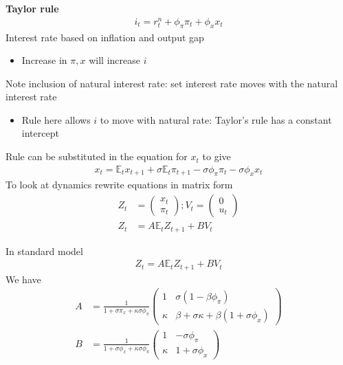 \documentclass{beamer}
\begin{document}
\begin{frame}
  \textbf{Taylor rule}  
\begin{align} 
  i_t=r_t^n+ \phi_{\pi}\pi_t+\phi_xx_t 
\end{align}
 \medskip
  Interest rate based on inflation and output gap
  \begin{itemize}
    \item Increase in $\pi,x$ will increase $i$    
  \end{itemize}
  \medskip
 Note inclusion of natural interest rate: set interest rate moves with the natural interest rate
 \begin{itemize}
   \item Rule here allows $i$ to move with natural rate: Taylor's rule has a constant intercept
 \end{itemize}
\end{frame}

\begin{frame}
  Rule can be substituted in the equation for $x_t$ to give
\begin{align}  
  x_t=\mathbb{E}_tx_{t+1} + \sigma \mathbb{E}_t \pi_{t+1} - \sigma\phi_{\pi}\pi_t -\sigma\phi_x x_t 
\end{align}  
 To look at dynamics rewrite equations in matrix form
 \begin{align}
  Z_t&=\begin{pmatrix} x_t \\ \pi_t \end{pmatrix}; V_t=\begin{pmatrix}  0 \\u_t \end{pmatrix} \\
  Z_t&=A\mathbb{E}_tZ_{t+1}+BV_t 
 \end{align}
\end{frame}


\begin{frame}
 In standard model
 \begin{align*}
   Z_t=A\mathbb{E}_tZ_{t+1}+BV_t 
 \end{align*}
  We have
  \begin{align}
  A &= \frac{1}{1+\sigma\pi_x + \kappa\sigma\phi_{\pi}} \begin{pmatrix}
    1 & \sigma(1-\beta\phi_{\pi}) \\
    \kappa & \beta + \sigma\kappa + \beta(1+\sigma\phi_x)
      \end{pmatrix}\\
  B &= \frac{1}{1+\sigma\phi_x + \kappa\sigma\phi_{\pi}} \begin{pmatrix}
    1 & -\sigma\phi_{\pi}\\
    \kappa & 1+\sigma\phi_x
  \end{pmatrix}
\end{align}  
\end{frame}
\end{document}
